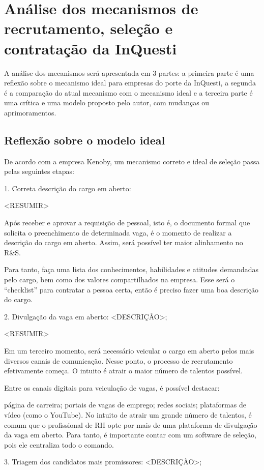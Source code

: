 \chapter{Análise dos mecanismos de recrutamento, seleção e contratação da InQuesti}
A análise dos mecanismos será apresentada em 3 partes: a primeira parte é uma reflexão sobre o mecanismo ideal para empresas do porte da InQuesti, a segunda 
é a comparação do atual mecanismo com o mecanismo ideal e a terceira parte é uma crítica e uma modelo proposto pelo autor, com mudanças
ou aprimoramentos. 

\section{Reflexão sobre o modelo ideal}
De acordo com a empresa Kenoby, um mecanismo correto e ideal de seleção passa pelas seguintes etapas:

1. Correta descrição do cargo em aberto: 


<RESUMIR>

Após receber e aprovar a requisição de pessoal, isto é, o documento formal que solicita o preenchimento de determinada vaga, é o momento de realizar a descrição do cargo em aberto. Assim, será possível ter maior alinhamento no R&S.


Para tanto, faça uma lista dos conhecimentos, habilidades e atitudes demandadas pelo cargo, bem como dos valores compartilhados na empresa. Esse será o “checklist” para contratar a pessoa certa, então é preciso fazer uma boa descrição do cargo.


2. Divulgação da vaga em aberto: <DESCRIÇÃO>;


<RESUMIR>

Em um terceiro momento, será necessário veicular o cargo em aberto pelos mais diversos canais de comunicação. Nesse ponto, o processo de recrutamento efetivamente começa. O intuito é atrair o maior número de talentos possível.


Entre os canais digitais para veiculação de vagas, é possível destacar:


página de carreira;
portais de vagas de emprego;
redes sociais;
plataformas de vídeo (como o YouTube).
No intuito de atrair um grande número de talentos, é comum que o profissional de RH opte por mais de uma plataforma de divulgação da vaga em aberto. Para tanto, é importante contar com um software de seleção, pois ele centraliza todo o comando.



3. Triagem dos candidatos mais promissores: <DESCRIÇÃO>;

